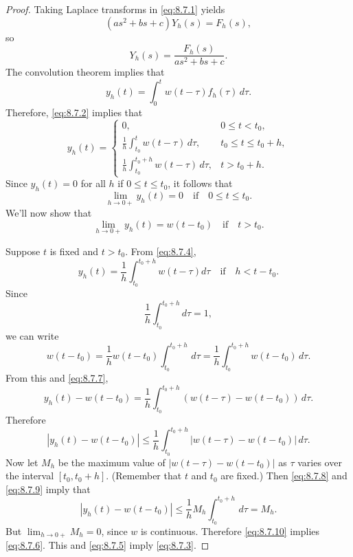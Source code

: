 \documentclass{ximera}
\begin{document}
\begin{proof}
Taking Laplace transforms in \eqref{eq:8.7.1} yields
$$
(as^2+bs+c)Y_h(s)=F_h(s),
$$
so
$$
Y_h(s)=\frac{F_h(s)}{as^2+bs+c}.
$$
The convolution theorem implies that
$$
y_h(t)=\int_0^t w(t-\tau)f_h(\tau)\,d\tau.
$$
Therefore,  \eqref{eq:8.7.2} implies that
\begin{equation} \label{eq:8.7.4}
y_h(t)=\left\{\begin{array}{cl} 0,&0\leq t<t_0,\\
\frac{1}{h}\int_{t_0}^tw(t-\tau)\,d\tau,&t_0\leq t\leq
t_0+h,\\
\frac{1}{h}\int_{t_0}^{t_0+h}w(t-\tau)\,d\tau,&t>t_0+h.\end{array}\right.
\end{equation}
Since $y_h(t)=0$ for all $h$ if $0\leq t\leq t_0$, it follows that
\begin{equation} \label{eq:8.7.5}
\lim_{h\to0+}y_h(t)=0 \quad\mbox{if}\quad 0\leq t\leq t_0.
\end{equation}
We'll now show that
\begin{equation} \label{eq:8.7.6}
\lim_{h\rightarrow0+}y_h(t)=w(t-t_0)\quad\mbox{if}\quad t>t_0.
\end{equation}

Suppose   $t$ is fixed and $t>t_0$.
From
\eqref{eq:8.7.4},
\begin{equation} \label{eq:8.7.7}
y_h(t)=\frac{1}{h}\int_{t_0}^{t_0+h}w(t-\tau)d\tau\quad\mbox{if}\quad
h<t-t_0.
\end{equation}
Since
\begin{equation} \label{eq:8.7.8}
\frac{1}{h}\int_{t_0}^{t_0+h}d\tau=1,
\end{equation}
we can write
$$
w(t-t_0)=\frac{1}{h}w(t-t_0)\int_{t_0}^{t_0+h}\,d\tau=
\frac{1}{h}\int_{t_0}^{t_0+h}w(t-t_0)\,d\tau.
$$
From this and \eqref{eq:8.7.7},
$$
y_h(t)-w(t-t_0)=
\frac{1}{h}\int_{t_0}^{t_0+h}\left(w(t-\tau)-w(t-t_0)\right)\,d\tau.
$$
Therefore
\begin{equation} \label{eq:8.7.9}
|y_h(t)-w(t-t_0)|\leq
\frac{1}{h}\int_{t_0}^{t_0+h}|w(t-\tau)-w(t-t_0)|\,d\tau.
\end{equation}
Now let $M_h$ be the maximum value of $|w(t-\tau)-w(t-t_0)|$ as $\tau$
varies over the interval $[t_0,t_0+h]$. (Remember that $t$ and $t_0$
are fixed.) Then \eqref{eq:8.7.8} and \eqref{eq:8.7.9} imply that
\begin{equation} \label{eq:8.7.10}
|y_h(t)-w(t-t_0)|\leq
\frac{1}{h}M_h\int_{t_0}^{t_0+h}\,d\tau=M_h.
\end{equation}
But $\lim_{h\rightarrow0+}M_h=0$, since $w$ is continuous.
Therefore \eqref{eq:8.7.10} implies \eqref{eq:8.7.6}.
This and \eqref{eq:8.7.5} imply \eqref{eq:8.7.3}. 
\end{proof}
\end{document}
